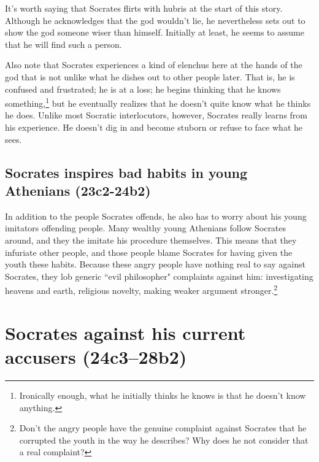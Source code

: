 \documentclass[11pt]{article}
\begin{document}
It's worth saying that Socrates flirts with hubris at the start of this
story.  Although he acknowledges that the god wouldn't lie, he nevertheless
sets out to show the god someone wiser than himself.  Initially at least,
he seems to assume that he will find such a person.

Also note that Socrates experiences a kind of elenchus here at the hands of
the god that is not unlike what he dishes out to other people later. That
is, he is confused and frustrated; he is at a loss; he begins thinking that
he knows something,\footnote{Ironically enough, what he initially thinks he
knows is that he doesn't know anything.} but he eventually realizes that
he doesn't quite know what he thinks he does.  Unlike most Socratic
interlocutors, however, Socrates really learns from his experience.  He
doesn't dig in and become stuborn or refuse to face what he sees.

\subsection{Socrates inspires bad habits in young Athenians (23c2-24b2)}

In addition to the people Socrates offends, he also has to worry about his
young imitators offending people.  Many wealthy young Athenians follow
Socrates around, and they the imitate his procedure themselves. This means
that they infuriate other people, and those people blame Socrates for
having given the youth these habits.  Because these angry people have
nothing real to say against Socrates, they lob generic ``evil philosopher"
complaints against him: investigating heavens and earth, religious novelty,
making weaker argument stronger.\footnote{Don't the angry people have the
genuine complaint against Socrates that he corrupted the youth in the way
he describes? Why does he not consider that a real complaint?}



\section{Socrates against his current accusers (24c3--28b2)}
\end{document}
